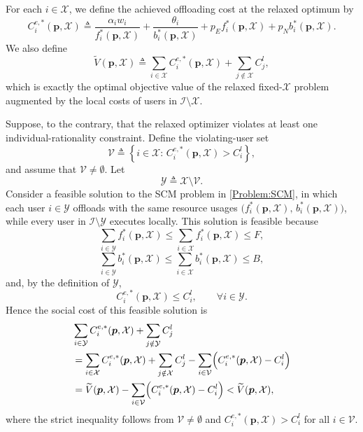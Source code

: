 \documentclass[lettersize,journal]{IEEEtran}
\begin{document}
For each $i\in\mathcal X$, we define the achieved offloading cost at the relaxed optimum by
\[
C_i^{e,*}(\boldsymbol p,\mathcal X)
\triangleq
\frac{\alpha_i w_i}{f_i^*(\boldsymbol p,\mathcal X)}
+
\frac{\theta_i}{b_i^*(\boldsymbol p,\mathcal X)}
+
p_E f_i^*(\boldsymbol p,\mathcal X)
+
p_N b_i^*(\boldsymbol p,\mathcal X).
\]
We also define
\[
\widetilde V(\boldsymbol p,\mathcal X)
\triangleq
\sum_{i\in\mathcal X} C_i^{e,*}(\boldsymbol p,\mathcal X)
+
\sum_{j\notin\mathcal X} C_j^l,
\]
which is exactly the optimal objective value of the relaxed fixed-$\mathcal X$ problem augmented by the local costs of users in $\mathcal I\setminus\mathcal X$.

Suppose, to the contrary, that the relaxed optimizer violates at least one individual-rationality constraint. Define the violating-user set
\[
\mathcal V
\triangleq
\left\{
i\in\mathcal X:\,
C_i^{e,*}(\boldsymbol p,\mathcal X)>C_i^l
\right\},
\]
and assume that $\mathcal V\neq\emptyset$.
Let
\[
\mathcal Y\triangleq \mathcal X\setminus\mathcal V .
\]
Consider a feasible solution to the SCM problem in \eqref{Problem:SCM}, in which each user $i\in\mathcal Y$ offloads with the same resource usages
$\bigl(f_i^*(\boldsymbol p,\mathcal X),\,b_i^*(\boldsymbol p,\mathcal X)\bigr)$,
while every user in $\mathcal I\setminus\mathcal Y$ executes locally.
This solution is feasible because
\[
\sum_{i\in\mathcal Y} f_i^*(\boldsymbol p,\mathcal X)
\le
\sum_{i\in\mathcal X} f_i^*(\boldsymbol p,\mathcal X)
\le F,
\]
\[
\sum_{i\in\mathcal Y} b_i^*(\boldsymbol p,\mathcal X)
\le
\sum_{i\in\mathcal X} b_i^*(\boldsymbol p,\mathcal X)
\le B,
\]
and, by the definition of $\mathcal Y$,
\[
C_i^{e,*}(\boldsymbol p,\mathcal X)\le C_i^l,
\qquad \forall i\in\mathcal Y .
\]
Hence the social cost of this feasible solution is
\begin{align*}
&\sum_{i\in\mathcal Y} C_i^{e,*}(\boldsymbol p,\mathcal X)
+\sum_{j\notin\mathcal Y} C_j^l\\
&=
\sum_{i\in\mathcal X} C_i^{e,*}(\boldsymbol p,\mathcal X)
+\sum_{j\notin\mathcal X} C_j^l
-\sum_{i\in\mathcal V}
\Bigl(
C_i^{e,*}(\boldsymbol p,\mathcal X)-C_i^l
\Bigr)\\
&=
\widetilde V(\boldsymbol p,\mathcal X)
-\sum_{i\in\mathcal V}
\Bigl(
C_i^{e,*}(\boldsymbol p,\mathcal X)-C_i^l
\Bigr)
<
\widetilde V(\boldsymbol p,\mathcal X),
\end{align*}
where the strict inequality follows from $\mathcal V\neq\emptyset$ and
$C_i^{e,*}(\boldsymbol p,\mathcal X)>C_i^l$ for all $i\in\mathcal V$.
\end{document}
